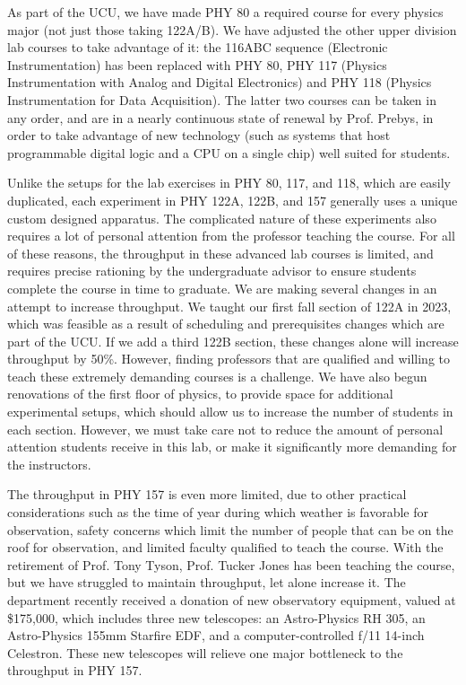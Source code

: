 \documentclass[12pt]{article}
\begin{document}
As part of the UCU, we have made PHY 80 a required course for every
physics major (not just those taking 122A/B).  We have adjusted the
other upper division lab courses to take advantage of it: the 116ABC
sequence (Electronic Instrumentation) has been replaced with PHY 80,
PHY 117 (Physics Instrumentation with Analog and Digital Electronics)
and PHY 118 (Physics Instrumentation for Data Acquisition).  The latter
two courses can be taken in any order, and are in a nearly continuous
state of renewal by Prof. Prebys, in order to take advantage of new
technology (such as systems that host programmable digital logic and a
CPU on a single chip) well suited for students.

Unlike the setups for the lab exercises in PHY 80, 117, and 118,
which are easily duplicated, each experiment in PHY 122A, 122B, and
157 generally uses a unique custom designed apparatus.  The
complicated nature of these experiments also requires a lot of personal
attention from the professor teaching the course.  For all of these
reasons, the throughput in these advanced lab courses is limited, and
requires precise rationing by the undergraduate advisor to ensure
students complete the course in time to graduate.  We are making
several changes in an attempt to increase throughput.  We taught our
first fall section of 122A in 2023, which was feasible as a result of
scheduling and prerequisites changes which are part of the UCU.  If we
add a third 122B section, these changes alone will increase throughput
by 50\%.  However, finding professors that are qualified and willing
to teach these extremely demanding courses is a challenge.  We have
also begun renovations of the first floor of physics, to provide space
for additional experimental setups, which should allow us to increase
the number of students in each section.  However, we must take care
not to reduce the amount of personal attention students receive in
this lab, or make it significantly more demanding for the instructors.

The throughput in PHY 157 is even more limited, due to other practical
considerations such as the time of year during which weather is
favorable for observation, safety concerns which limit the number of
people that can be on the roof for observation, and limited faculty
qualified to teach the course.  With the retirement of Prof. Tony
Tyson, Prof. Tucker Jones has been teaching the course, but we have
struggled to maintain throughput, let alone increase it.  The department recently received a donation of new observatory equipment, valued at \$175,000, which includes three new telescopes: an Astro-Physics RH 305, an Astro-Physics 155mm Starfire EDF, and a computer-controlled f/11 14-inch Celestron.  These new telescopes will relieve one major bottleneck to the throughput in PHY 157.\\[3pt]
\end{document}
